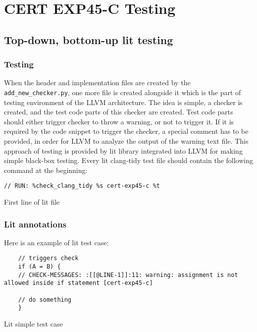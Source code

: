 \section{CERT EXP45-C Testing}

\subsection{Top-down, bottom-up lit testing}

\subsubsection{Testing}

When the header and implementation files are created by the \lstinline{add_new_checker.py}, one more file is created alongside it which is the part of testing environment of the LLVM architecture. The idea is simple, a checker is created, and the test code parts of this checker are created. Test code parts should either trigger checker to throw a warning, or not to trigger it. If it is required by the code snippet to trigger the checker, a special comment has to be provided, in order for LLVM to analyze the output of the warning text file. This approach of testing is provided by lit library integrated into LLVM for making simple black-box testing. Every lit clang-tidy test file should contain the following command at the beginning:

\begin{listing}[H]
\begin{verbatim}
// RUN: %check_clang_tidy %s cert-exp45-c %t
\end{verbatim}
\caption{First line of lit file}
\end{listing}

\subsubsection{Lit annotations}

Here is an example of lit test case:
\begin{listing}[H]
\begin{verbatim}
    // triggers check 
    if (A = B) {
    // CHECK-MESSAGES: :[[@LINE-1]]:11: warning: assignment is not allowed inside if statement [cert-exp45-c]

    // do something 
    }
\end{verbatim}
\caption{Lit simple test case}
\end{listing}

